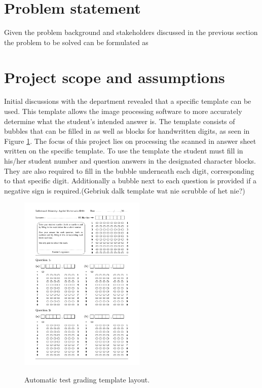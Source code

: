 \section{Problem statement}
\label{sec:problemStatement}

Given the problem background and stakeholders discussed in the previous section the problem to be solved can be formulated as
\newline
\newline
\noindent{}

\section{Project scope and assumptions}\label{sec:Scope}
Initial discussions with the department revealed that a specific template can be used. This template allows the image processing software to more accurately determine what the student's intended answer is. The template consists of bubbles that can be filled in as well as blocks for handwritten digits, as seen in Figure \ref{fig:NumbersTemplate}. The focus of this project lies on processing the scanned in answer sheet written on the specific template. To use the template the student must fill in his/her student number and question answers in the designated character blocks. They are also required to fill in the bubble underneath each digit, corresponding to that specific digit. Additionally a bubble next to each question is provided if a negative sign is required.(Gebriuk dalk template wat nie scrubble of het nie?)


\begin{figure}
  \centering
  \includegraphics[width=6cm]{NumbersTemplate}\\
  \caption{Automatic test grading template layout.}
  \label{fig:NumbersTemplate}
\end{figure}


